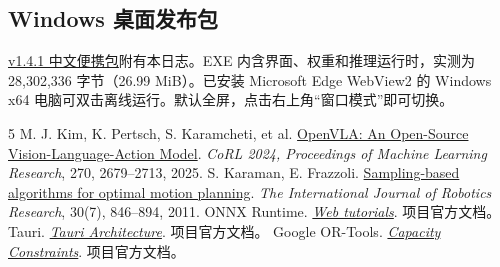 \documentclass[a4paper,fontset=fandol,zihao=5]{ctexart}
\newcommand{\subhead}[1]{\subsection*{#1}}
\begin{document}
\subhead{Windows 桌面发布包}
\href{https://github.com/ZHT1235456/OpenVLA-Based-Unmanned-Surface-Vessel-Inspection-Simulator/releases/tag/v1.4.1}{v1.4.1 中文便携包}附有本日志。EXE 内含界面、权重和推理运行时，实测为 28,302,336 字节（26.99 MiB）。已安装 Microsoft Edge WebView2 的 Windows x64 电脑可双击离线运行。默认全屏，点击右上角“窗口模式”即可切换。

\begingroup
\small
\setlength{\parskip}{0pt}
\renewcommand{\refname}{参考文献}
\begin{thebibliography}{5}
\setlength{\itemsep}{0.5pt}\setlength{\parskip}{0pt}
 M. J. Kim, K. Pertsch, S. Karamcheti, et al.
\href{https://proceedings.mlr.press/v270/kim25c.html}{OpenVLA: An Open-Source Vision-Language-Action Model}.
\emph{CoRL 2024, Proceedings of Machine Learning Research}, 270, 2679--2713, 2025.
 S. Karaman, E. Frazzoli.
\href{https://doi.org/10.1177/0278364911406761}{Sampling-based algorithms for optimal motion planning}.
\emph{The International Journal of Robotics Research}, 30(7), 846--894, 2011.
 ONNX Runtime. \href{https://onnxruntime.ai/docs/tutorials/web/}{\emph{Web tutorials}}. 项目官方文档。
 Tauri. \href{https://v2.tauri.app/concept/architecture/}{\emph{Tauri Architecture}}. 项目官方文档。
 Google OR-Tools. \href{https://developers.google.com/optimization/routing/cvrp}{\emph{Capacity Constraints}}. 项目官方文档。
\end{thebibliography}
\endgroup
\end{document}
